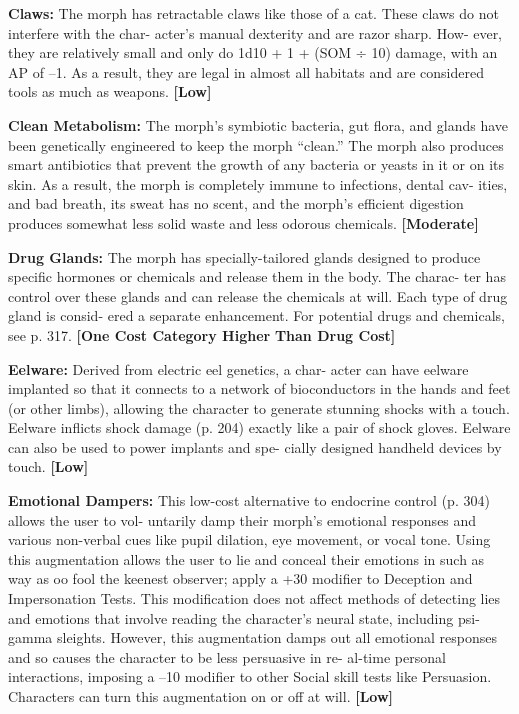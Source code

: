 \textbf{Claws: }The morph has retractable claws like those 
of a cat. These claws do not interfere with the char-
acter's manual dexterity and are razor sharp. How-
ever, they are relatively small and only do 1d10 + 1 
+ (SOM ÷ 10) damage, with an AP of –1. As a result, 
they are legal in almost all habitats and are considered 
tools as much as weapons. \textbf{[Low]}

\textbf{Clean Metabolism: }The morph's symbiotic bacteria, 
gut flora, and glands have been genetically engineered 
to keep the morph ``clean.'' The morph also produces 
smart antibiotics that prevent the growth of any 
bacteria or yeasts in it or on its skin. As a result, the 
morph is completely immune to infections, dental cav-
ities, and bad breath, its sweat has no scent, and the 
morph's efficient digestion produces somewhat less 
solid waste and less odorous chemicals. \textbf{[Moderate]}

\textbf{Drug Glands: }The morph has specially-tailored 
glands designed to produce specific hormones or 
chemicals and release them in the body. The charac-
ter has control over these glands and can release the 
chemicals at will. Each type of drug gland is consid-
ered a separate enhancement. For potential drugs and 
chemicals, see p. 317. \textbf{[One Cost Category Higher }
\textbf{Than Drug Cost]}

\textbf{Eelware:} Derived from electric eel genetics, a char-
acter can have eelware implanted so that it connects 
to a network of bioconductors in the hands and feet 
(or other limbs), allowing the character to generate 
stunning shocks with a touch. Eelware inflicts shock 
damage (p. 204) exactly like a pair of shock gloves. 
Eelware can also be used to power implants and spe-
cially designed handheld devices by touch. \textbf{[Low]}

\textbf{Emotional Dampers: }This low-cost alternative to 
endocrine control (p. 304) allows the user to vol-
untarily damp their morph's emotional responses 
and various non-verbal cues like pupil dilation, eye 
movement, or vocal tone. Using this augmentation 
allows the user to lie and conceal their emotions in 
such as way as oo fool the keenest observer; apply a 
+30 modifier to Deception and Impersonation Tests. 
This modification does not affect methods of detecting 
lies and emotions that involve reading the character's 
neural state, including psi-gamma sleights. However, 
this augmentation damps out all emotional responses 
and so causes the character to be less persuasive in re-
al-time personal interactions, imposing a –10 modifier 
to other Social skill tests like Persuasion. Characters 
can turn this augmentation on or off at will. \textbf{[Low]}

